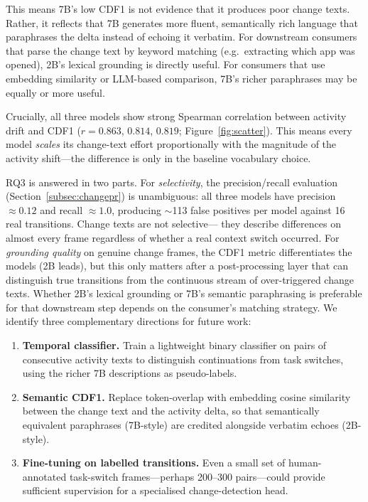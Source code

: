 \documentclass[10pt, twocolumn]{article}
\begin{document}
This means 7B's low CDF1 is not evidence that it produces poor change texts.
Rather, it reflects that 7B generates more fluent, semantically rich language that
paraphrases the delta instead of echoing it verbatim. For downstream consumers that
parse the change text by keyword matching (e.g.\ extracting which app was opened),
2B's lexical grounding is directly useful. For consumers that use embedding similarity
or LLM-based comparison, 7B's richer paraphrases may be equally or more useful.

Crucially, all three models show strong Spearman correlation between activity drift
and CDF1 ($r = 0.863$, $0.814$, $0.819$; Figure~\ref{fig:scatter}). This means every
model \emph{scales} its change-text effort proportionally with the magnitude of the
activity shift---the difference is only in the baseline vocabulary choice.

RQ3 is answered in two parts. For \emph{selectivity}, the precision/recall
evaluation (Section~\ref{subsec:changepr}) is unambiguous: all three models have
precision $\approx 0.12$ and recall $\approx 1.0$, producing $\sim$113 false
positives per model against 16 real transitions. Change texts are not selective---
they describe differences on almost every frame regardless of whether a real context
switch occurred. For \emph{grounding quality} on genuine change frames, the CDF1
metric differentiates the models (2B leads), but this only matters after a
post-processing layer that can distinguish true transitions from the continuous stream
of over-triggered change texts. Whether 2B's lexical grounding or 7B's semantic
paraphrasing is preferable for that downstream step depends on the consumer's
matching strategy.
We identify three complementary directions for future work:
\begin{enumerate}
  \item \textbf{Temporal classifier.} Train a lightweight binary classifier on
        pairs of consecutive activity texts to distinguish continuations from
        task switches, using the richer 7B descriptions as pseudo-labels.
  \item \textbf{Semantic CDF1.} Replace token-overlap with embedding cosine
        similarity between the change text and the activity delta, so that
        semantically equivalent paraphrases (7B-style) are credited alongside
        verbatim echoes (2B-style).
  \item \textbf{Fine-tuning on labelled transitions.} Even a small set of
        human-annotated task-switch frames---perhaps 200--300 pairs---could provide
        sufficient supervision for a specialised change-detection head.
\end{enumerate}
\end{document}

